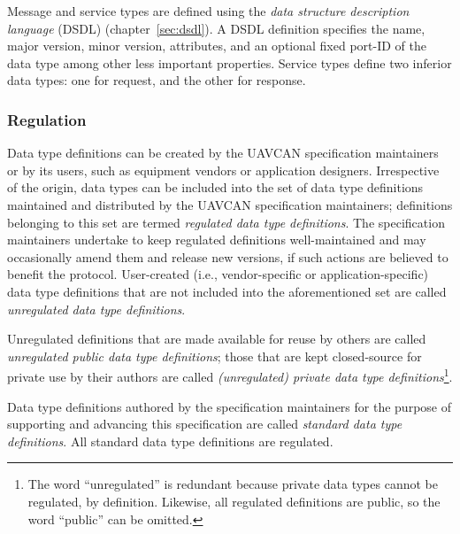 Message and service types
are defined using the \emph{data structure description language} (DSDL) (chapter~\ref{sec:dsdl}).
A DSDL definition specifies the name, major version, minor version, attributes,
and an optional fixed port-ID of the data type among other less important properties.
Service types define two inferior data types: one for request, and the other for response.

\subsubsection{Regulation}\label{sec:basic_data_type_regulation}

Data type definitions can be created by the UAVCAN specification maintainers or by its users,
such as equipment vendors or application designers.
Irrespective of the origin, data types can be included into the set of data type definitions maintained
and distributed by the UAVCAN specification maintainers;
definitions belonging to this set are termed \emph{regulated data type definitions}.
The specification maintainers undertake to keep regulated definitions well-maintained and may occasionally
amend them and release new versions, if such actions are believed to benefit the protocol.
User-created (i.e., vendor-specific or application-specific) data type definitions that are
not included into the aforementioned set are called \emph{unregulated data type definitions}.

Unregulated definitions that are made available for reuse by others are called
\emph{unregulated public data type definitions};
those that are kept closed-source for private use by their authors are called
\emph{(unregulated) private data type definitions}\footnote{%
    The word ``unregulated'' is redundant because private data types cannot be regulated, by definition.
    Likewise, all regulated definitions are public, so the word ``public'' can be omitted.
}.

Data type definitions authored by the specification maintainers for the purpose of supporting and advancing
this specification are called \emph{standard data type definitions}.
All standard data type definitions are regulated.

